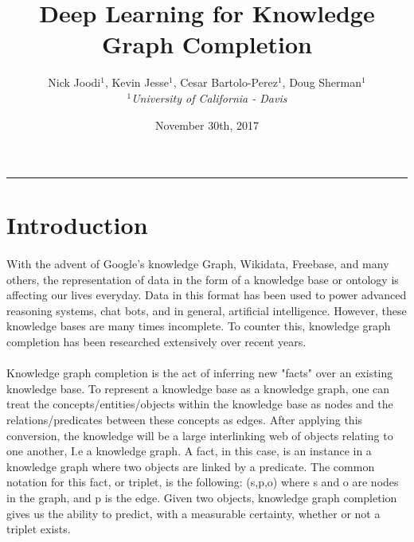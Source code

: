\documentclass[11.5pt]{article}
\begin{document}
\title{Deep Learning for Knowledge Graph Completion}
\author{Nick Joodi$^1$, Kevin Jesse$^1$, Cesar Bartolo-Perez$^1$, Doug Sherman$^1$\\
	{\small
	\textit{$^1$University of California - Davis}}
} 
\date{November 30th, 2017}
\maketitle
\rule{\textwidth}{1pt}

\begin{abstract}

\end{abstract}

\tableofcontents

\section{Introduction}
\paragraph{} With the advent of Google's knowledge Graph, Wikidata, Freebase, and many others, the representation of data in the form of a knowledge base or ontology is affecting our lives everyday. Data in this format has been used to power advanced reasoning systems, chat bots, and in general, artificial intelligence. However, these knowledge bases are many times incomplete. To counter this, knowledge graph completion has been researched extensively over recent years. 

\paragraph{} Knowledge graph completion is the act of inferring new "facts" over an existing knowledge base. To represent a knowledge base as a knowledge graph, one can treat the concepts/entities/objects within the knowledge base as nodes and the relations/predicates between these concepts as edges. After applying this conversion, the knowledge will be a large interlinking web of objects relating to one another, I.e a knowledge graph. A fact, in this case, is an instance in a knowledge graph where two objects are linked by a predicate. The common notation for this fact, or triplet, is the following:  (s,p,o) where s and o are nodes in the graph, and p is the edge. Given two objects, knowledge graph completion gives us the ability to predict, with a measurable certainty, whether or not a triplet exists.
\end{document}
